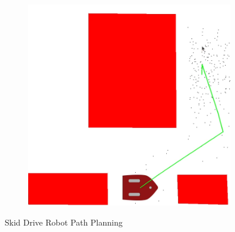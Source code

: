 \documentclass{article}
\begin{document}
\begin{figure}[H]
\begin{subfigure}{0.4\textwidth}
        \includegraphics[width = \textwidth]{imgs/path_skid_2.png}
    \end{subfigure}
    \caption{Skid Drive Robot Path Planning}
    \label{fig:skid-drive-path}
\end{figure}
\end{document}
